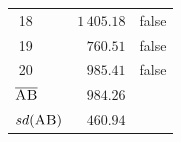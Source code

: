 \documentclass[xcolor={table}]{beamer}
\newcommand{\featN}[1]{\textsc{#1}}
\begin{document}
\begin{frame} [plain]
\begin{table}[!tb]
\begin{footnotesize}
\begin{columns}
\begin{column}{0.5\textwidth}
\begin{tabular}{ccrr}
18 & 	~ & 	$1\,405.18$ &false\\
19 & 	~ & 	$760.51$ &false\\
20 & 	~ & 	$985.41$ &false\\
\hline
\multicolumn{2}{l}{$\overline{\featN{AB}}$} & $984.26$ & ~\\
\multicolumn{2}{l}{$sd(\featN{AB})$} & $460.94$ & ~\\
\hline
\end{tabular}
\end{column}
\end{columns}
\end{footnotesize}
\end{table}
\end{frame} 
\end{document}
